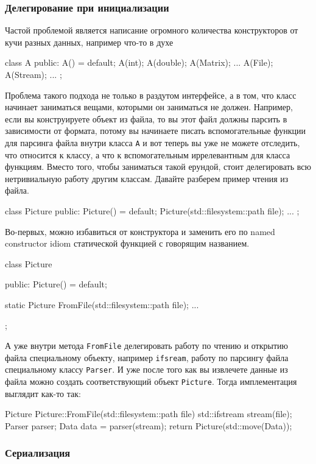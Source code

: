 \subsubsection{Делегирование при инициализации}

Частой проблемой является написание огромного количества конструкторов от кучи разных данных, например что-то в духе
\begin{cppcode}
class A {
public:
  A() = default;
  A(int);
  A(double);
  A(Matrix);
  ...
  A(File);
  A(Stream);
  ...
};
\end{cppcode}
Проблема такого подхода не только в раздутом интерфейсе, а в том, что класс начинает заниматься вещами, которыми он заниматься не должен.
Например, если вы конструируете объект из файла, то вы этот файл должны парсить в зависимости от формата, потому вы начинаете писать вспомогательные функции для парсинга файла внутри класса \verb"A" и вот теперь вы уже не можете отследить, что относится к классу, а что к вспомогательным иррелевантным для класса функциям.
Вместо того, чтобы заниматься такой ерундой, стоит делегировать всю нетривиальную работу другим классам.
Давайте разберем пример чтения из файла.
\begin{cppcode}
class Picture {
public:
  Picture() = default;
  Picture(std::filesystem::path file);
  ...
};
\end{cppcode}
Во-первых, можно избавиться от конструктора и заменить его по named constructor idiom статической функцией с говорящим названием.
\begin{cppcode}
class Picture {
public:
  Picture() = default;
  
  static Picture FromFile(std::filesystem::path file);
  ...
};
\end{cppcode}
А уже внутри метода \verb"FromFile" делегировать работу по чтению и открытию файла специальному объекту, например \verb"ifsream", работу по парсингу файла специальному классу \verb"Parser".
И уже после того как вы извлечете данные из файла можно создать соответствующий объект \verb"Picture".
Тогда имплементация выглядит как-то так:
\begin{cppcode}
Picture Picture::FromFile(std::filesystem::path file) {
  std::ifstream stream(file);
  Parser parser;
  Data data = parser(stream);
  return Picture(std::move(Data));
}
\end{cppcode}

\subsubsection{Сериализация}
\label{section::Serialization}
